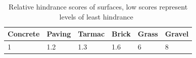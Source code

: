 \begin{table}[hb]
\caption[Relative hindrance scores of surfaces]{Relative hindrance scores of surfaces, low scores represent levels of least hindrance~\cite{Matthews2003} \label{hindrance}}
\centering
\begin{tabular}{|l|l|l|l|l|l|}
	\hline
	Concrete & Paving & Tarmac & Brick & Grass & Gravel\\
	\hline
	1 & 1.2 & 1.3 & 1.6 & 6 & 8 \\
	\hline
\end{tabular}
\end{table}